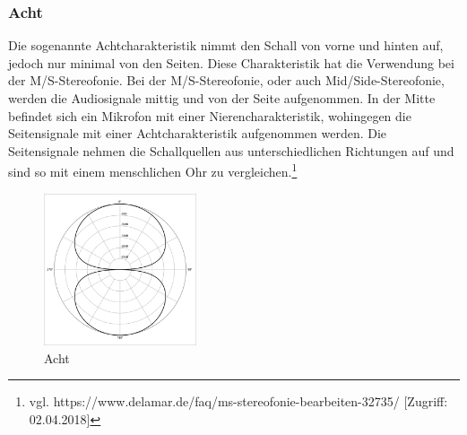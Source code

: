 \subsubsection{Acht}
Die sogenannte Achtcharakteristik nimmt den Schall von vorne und hinten auf, jedoch nur minimal von den Seiten. Diese Charakteristik hat die Verwendung bei der M/S-Stereofonie.\newline
Bei der M/S-Stereofonie, oder auch Mid/Side-Stereofonie, werden die Audiosignale mittig und von der Seite aufgenommen. In der Mitte befindet sich ein Mikrofon mit einer Nierencharakteristik, wohingegen die Seitensignale mit einer Achtcharakteristik aufgenommen werden. Die Seitensignale nehmen die Schallquellen aus unterschiedlichen Richtungen auf und sind so mit einem menschlichen Ohr zu vergleichen.\footnote{vgl. https://www.delamar.de/faq/ms-stereofonie-bearbeiten-32735/ [Zugriff: 02.04.2018]}
\begin{figure}[H]
	\centering
	\includegraphics[width=0.4\textwidth]{abb7} 
	\caption[Acht]{Acht\footnotemark}
\end{figure}
